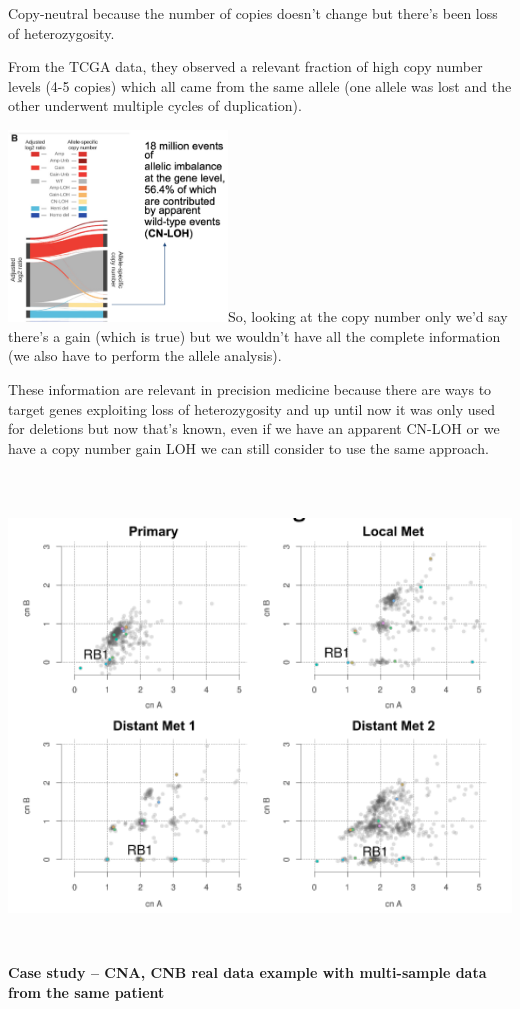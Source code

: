 Copy-neutral because the number of copies doesn't change but there's been loss
of heterozygosity.

From the TCGA data, they observed a relevant fraction of high copy number levels
(4-5 copies) which all came from the same allele (one allele was lost and the
other underwent multiple cycles of duplication).

\includegraphics[width=2.29167in,height=2.00347in]{image14.png}So, looking at
the copy number only we'd say there's a gain (which is true) but we wouldn't
have all the complete information (we also have to perform the allele analysis).

These information are relevant in precision medicine because there are ways to
target genes exploiting loss of heterozygosity and up until now it was only used
for deletions but now that's known, even if we have an apparent CN-LOH or we
have a copy number gain LOH we can still consider to use the same approach.

\includegraphics[width=6.58333in,height=5.0625in]{image15.png}\textbf{Case study
-- CNA, CNB real data example with multi-sample data from the same patient}

